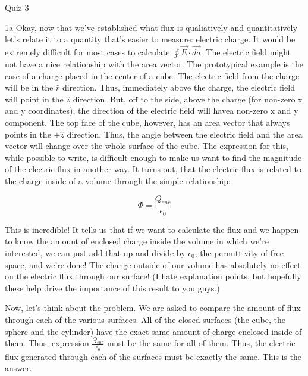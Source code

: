 \begin{homeworkProblem}{Quiz 3}
\begin{homeworkSection}{1a}
        Okay, now that we've established what flux is qualiatively and
        quantitatively let's relate it to a quantity that's easier to
        measure: electric charge. It would be extremely difficult for
        most cases to calculate $\oint \vec{E}\cdot \vec{da}$. The
        electric field might not have a nice relationship with the area
        vector. The prototypical example is the case of a charge placed
        in the center of a cube. The electric field from the charge will
        be in the $\hat{r}$ direction. Thus, immediately above the
        charge, the electric field will point in the $\hat{z}$
        direction. But, off to the side, above the charge (for non-zero
        x and y coordinates), the direction of the electric field will
        havea non-zero x and y component. The top face of the cube,
        however, has an area vector that always points in the $+\hat{z}$
        direction. Thus, the angle between the electric field and the
        area vector will change over the whole surface of the cube. The
        expression for this, while possible to write, is difficult
        enough to make us want to find the magnitude of the electric
        flux in another way. It turns out, that the electric flux is
        related to the charge inside of a volume through the simple
        relationship:

        \[
        \Phi = \frac{Q_{enc}}{\epsilon_0}
        \]

        This is incredible! It tells us that if we want to calculate the
        flux and we happen to know the amount of enclosed charge inside
        the volume in which we're interested, we can just add that up
        and divide by $\epsilon_0$, the permittivity of free space, and
        we're done! The change outside of our volume has absolutely no
        effect on the electric flux through our surface! (I hate
        explanation points, but hopefully these help drive the
        importance of this result to you guys.)

        Now, let's think about the problem. We are asked to compare the
        amount of flux through each of the various surfaces. All of the
        closed surfaces (the cube, the sphere and the cylinder) have the
        exact same amount of charge enclosed inside of them. Thus,
        expression $\frac{Q_{enc}}{\epsilon_0}$ must be the same for all
        of them. Thus, the electric flux generated through each of the
        surfaces must be exactly the same. This is the answer.

    \end{homeworkSection}


\end{homeworkProblem}
